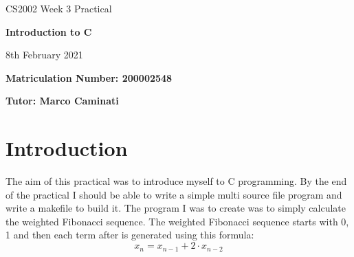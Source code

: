 \documentclass{article}
\begin{document}
\nocite{*}

\begin{center}
\Huge 
CS2002 Week 3 Practical

\vspace{0.5cm}

\textbf{Introduction to C}

\vspace{1cm}
\LARGE
8th February 2021

\large
\vspace{1.5cm}

\textbf{Matriculation Number: 200002548}

\vspace{0.5cm}

\textbf{Tutor: Marco Caminati}

\end{center}

\vspace*{3cm}	

\tableofcontents

\newpage
\section{Introduction}
The aim of this practical was to introduce myself to C programming. By the end of the practical I should be able to write a simple multi source file program and write a makefile to build it. The program I was to create was to simply calculate the weighted Fibonacci sequence. The weighted Fibonacci sequence starts with 0, 1 and then each term after is generated using this formula: \[x_n=x_{n-1} + 2 \cdot x_{n-2}\]
\end{document}
